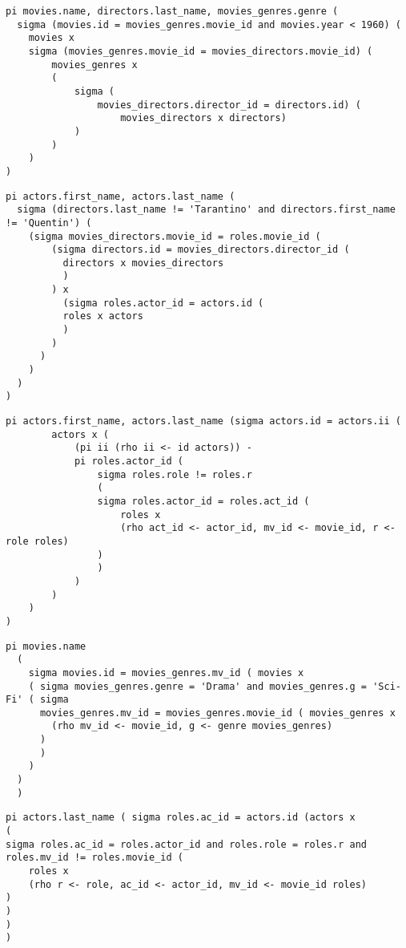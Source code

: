 \documentclass{article}
\begin{document}
\begin{problem}
\end{problem}

\begin{solution}$ $

\begin{lstlisting}[mathescape=true]
pi movies.name, directors.last_name, movies_genres.genre (
  sigma (movies.id = movies_genres.movie_id and movies.year < 1960) (
	movies x 
	sigma (movies_genres.movie_id = movies_directors.movie_id) (
		movies_genres x
		(
			sigma (
				movies_directors.director_id = directors.id) (
					movies_directors x directors)
			)
		)
	)
)
  \end{lstlisting}

\begin{lstlisting}
pi actors.first_name, actors.last_name (
  sigma (directors.last_name != 'Tarantino' and directors.first_name != 'Quentin') (
    (sigma movies_directors.movie_id = roles.movie_id (
	    (sigma directors.id = movies_directors.director_id (
          directors x movies_directors
          )
        ) x 
	      (sigma roles.actor_id = actors.id (
          roles x actors
          )
        )
      )   
    )
  )
)
\end{lstlisting}

\begin{lstlisting}
pi actors.first_name, actors.last_name (sigma actors.id = actors.ii (
		actors x (
			(pi ii (rho ii <- id actors)) - 
			pi roles.actor_id (
				sigma roles.role != roles.r
				(
				sigma roles.actor_id = roles.act_id (
					roles x
					(rho act_id <- actor_id, mv_id <- movie_id, r <- role roles)
				)
				)
			)
		)
	)
)
\end{lstlisting}

\begin{lstlisting}
pi movies.name
  (
    sigma movies.id = movies_genres.mv_id ( movies x 
    ( sigma movies_genres.genre = 'Drama' and movies_genres.g = 'Sci-Fi' ( sigma 
      movies_genres.mv_id = movies_genres.movie_id ( movies_genres x 
        (rho mv_id <- movie_id, g <- genre movies_genres)
      )
      )
    )
  )
  )
\end{lstlisting}

\begin{lstlisting}
pi actors.last_name ( sigma roles.ac_id = actors.id (actors x 
(
sigma roles.ac_id = roles.actor_id and roles.role = roles.r and roles.mv_id != roles.movie_id (
	roles x
	(rho r <- role, ac_id <- actor_id, mv_id <- movie_id roles)
)
)
)
)
\end{lstlisting}


\end{solution}
\end{document}
